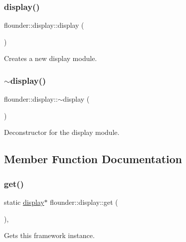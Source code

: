 \subsubsection{\texorpdfstring{display()}{display()}}
{\footnotesize\ttfamily flounder\+::display\+::display (\begin{DoxyParamCaption}{ }\end{DoxyParamCaption})}



Creates a new display module. 

\mbox{\label{classflounder_1_1display_a272f9080af9079cbb3890b18c3e4d394}} 
\subsubsection{\texorpdfstring{$\sim$display()}{~display()}}
{\footnotesize\ttfamily flounder\+::display\+::$\sim$display (\begin{DoxyParamCaption}{ }\end{DoxyParamCaption})}



Deconstructor for the display module. 



\subsection{Member Function Documentation}
\mbox{\label{classflounder_1_1display_a7c7015939f48bf4526bb0330ea4fcd2f}} 
\subsubsection{\texorpdfstring{get()}{get()}}
{\footnotesize\ttfamily static \hyperlink{classflounder_1_1display}{display}$\ast$ flounder\+::display\+::get (\begin{DoxyParamCaption}{ }\end{DoxyParamCaption})\hspace{0.3cm}{\ttfamily [inline]}, {\ttfamily [static]}}



Gets this framework instance. 

